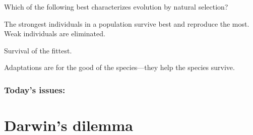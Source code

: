 \begin{noheadline}
\begin{frame}
    \begin{clickerquestion}
        \item Which of the following best characterizes evolution by natural
            selection?
        \begin{clickeroptions}
            \item The strongest individuals in a population survive best and
                reproduce the most. Weak individuals are eliminated. 
            \item Survival of the fittest.
            \item {}
            \item Adaptations are for the good of the species---they help the
                species survive.
        \end{clickeroptions}
    \end{clickerquestion}
\end{frame}
\end{noheadline}

\begin{noheadline}
\begin{frame}
\frametitle{Today's issues:}
\tableofcontents
\end{frame}
\end{noheadline}

\section{Darwin's dilemma}

